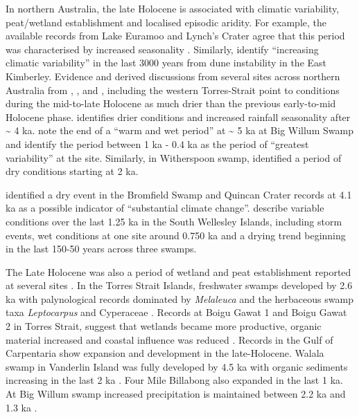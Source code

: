 \documentclass[
  12pt,
]{book}
\begin{document}
In northern Australia, the late Holocene is associated with climatic variability, peat/wetland establishment and localised episodic aridity. For example, the available records from Lake Euramoo and Lynch's Crater agree that this period was characterised by increased seasonality \citep{haberle23000yrPollen2005, reevesPalaeoenvironmentalChangeTropical2013}. Similarly, \citet{headPalaeoecologyArchaeologyEast1992} identify ``increasing climatic variability'' in the last 3000 years from dune instability in the East Kimberley. Evidence and derived discussions from several sites across northern Australia from \citet{leesGeomorphologicalEvidenceLate1992a}, \citet{shulmeisterAustralasianEvidenceMidholocene1999}, and \citet{gaganPostglacialEvolutionIndoPacific2004}, including the western Torres-Strait \citep{rowePalynologicalInvestigationHolocene2007} point to conditions during the mid-to-late Holocene as much drier than the previous early-to-mid Holocene phase. \citet{haberle23000yrPollen2005} identifies drier conditions and increased rainfall seasonality after \textasciitilde{} 4 ka. \citet{stevensonPalaeoenvironmentalHistoryBig2015} note the end of a ``warm and wet period'' at \textasciitilde{} 5 ka at Big Willum Swamp and identify the period between 1 ka - 0.4 ka as the period of ``greatest variability'' at the site. Similarly, in Witherspoon swamp, \citet{mossEnvironmentalContextLate2015} identified a period of dry conditions starting at 2 ka.

\citet{burrowsNewLateQuaternary2016a} identified a dry event in the Bromfield Swamp and Quincan Crater records at 4.1 ka as a possible indicator of ``substantial climate change''. \citet{mackenzieGeochemicalInvestigationSouth2017} describe variable conditions over the last 1.25 ka in the South Wellesley Islands, including storm events, wet conditions at one site around 0.750 ka and a drying trend beginning in the last 150-50 years across three swamps.

The Late Holocene was also a period of wetland and peat establishment reported at several sites \citep{roweLateHoloceneSwamp2015, stevensonPalaeoenvironmentalHistoryBig2015, lulyHolocenePalaeoenvironmentsChange2006}. In the Torres Strait Islands, freshwater swamps developed by 2.6 ka with palynological records dominated by \emph{Melaleuca} and the herbaceous swamp taxa \emph{Leptocarpus} and Cyperaceae \citep{roweLateHoloceneSwamp2015}. Records at Boigu Gawat 1 and Boigu Gawat 2 in Torres Strait, suggest that wetlands became more productive, organic material increased and coastal influence was reduced \citep{rowePalynologicalInvestigationHolocene2007, roweLateHoloceneSwamp2015}. Records in the Gulf of Carpentaria show expansion and development in the late-Holocene. Walala swamp in Vanderlin Island was fully developed by 4.5 ka with organic sediments increasing in the last 2 ka \citep{prebbleHolocenePollenDiatom2005}. Four Mile Billabong also expanded in the last 1 ka. At Big Willum swamp increased precipitation is maintained between 2.2 ka and 1.3 ka \citep{proskeHoloceneDiatomRecords2017a}.
\end{document}
